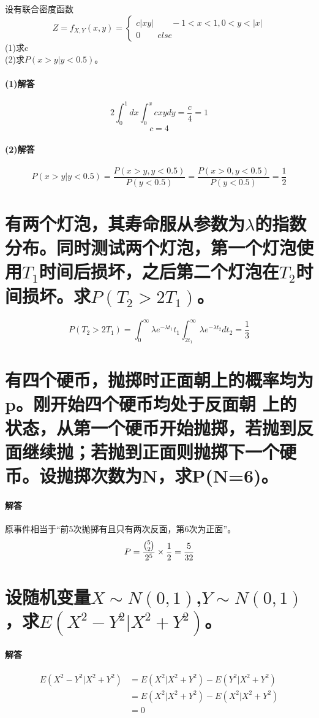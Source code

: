\documentclass[UTF8]{ctexart}
\begin{document}
\section{}
设有联合密度函数\begin{equation*}
Z= f_{X,Y}(x,y)=\begin{cases}
c\lvert xy\rvert\quad\quad -1<x<1,0<y<\lvert x\rvert\\
0 \quad\quad else
\end{cases}
\end{equation*}
(1)求c\\
(2)求$P(x>y\lvert y<0.5)$。
\paragraph{(1)解答}
\[2\int_0^1{dx}\int_0^x{cxydy}=\frac{c}{4}=1\]
\[c=4\]
\paragraph{(2)解答}
\[P(x>y\lvert y<0.5)=\frac{P(x>y,y<0.5)}{P(y<0.5)}=\frac{P(x>0,y<0.5)}{P(y<0.5)}=\frac{1}{2}\]
\section{有两个灯泡，其寿命服从参数为$\lambda$的指数分布。同时测试两个灯泡，第一个灯泡使用$T_1$时间后损坏，之后第二个灯泡在$T_2$时间损坏。求$P(T_2>2T_1)$。}
\[P(T_2>2T_1)=\int_0^{\infty}{\lambda e^{-\lambda t_1}t_1}\int_{2t_1}^{\infty}{\lambda e^{-\lambda t_2}dt_2}=\frac{1}{3}\]
\section{有四个硬币，抛掷时正面朝上的概率均为p。刚开始四个硬币均处于反面朝
上的状态，从第一个硬币开始抛掷，若抛到反面继续抛；若抛到正面则抛掷下一个硬币。设抛掷次数为N，求P(N=6)。}
\paragraph{解答}
原事件相当于“前5次抛掷有且只有两次反面，第6次为正面”。
\[P=\frac{\tbinom{5}{2}}{2^5}\times\frac{1}{2}=\frac{5}{32}\]
\section{设随机变量$X\sim N(0,1)$,$Y\sim N(0,1)$，求$E(X^2-Y^2\lvert X^2+Y^2)$。}
\paragraph{解答}
\begin{equation*}
\begin{aligned}
E(X^2-Y^2\lvert X^2+Y^2)&=E(X^2\lvert X^2+Y^2)-E(Y^2\lvert X^2+Y^2)\\
&=E(X^2\lvert X^2+Y^2)-E(X^2\lvert X^2+Y^2)\\
&=0
\end{aligned}
\end{equation*}
\end{document}
